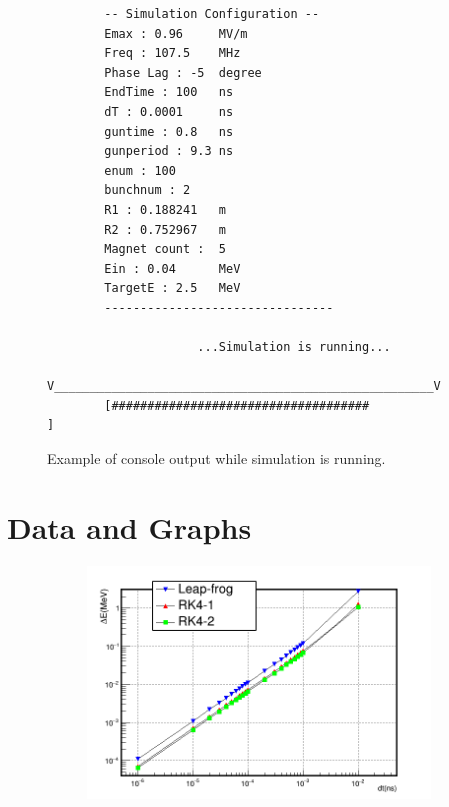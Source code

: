 \documentclass[a4paper,oneside,12pt]{report}
\numberwithin{equation}{chapter}
\begin{document}
{\begin{figure}[H]
    \centering
    \begin{verbatim}
        -- Simulation Configuration --
        Emax : 0.96     MV/m
        Freq : 107.5    MHz
        Phase Lag : -5  degree
        EndTime : 100   ns
        dT : 0.0001     ns
        guntime : 0.8   ns
        gunperiod : 9.3 ns
        enum : 100
        bunchnum : 2
        R1 : 0.188241   m
        R2 : 0.752967   m
        Magnet count :  5
        Ein : 0.04      MeV
        TargetE : 2.5   MeV
        --------------------------------
        
                     ...Simulation is running...
        V_____________________________________________________V
        [####################################                 ]
    \end{verbatim}
    \vspace{20pt}
\caption{Example of console output while simulation is running.}
\label{fig:console_output_running}
\end{figure}

\chapter{Data and Graphs}\label{appendix:data_graph}

\iffalse \begin{figure}[H]
    \centering
    \begin{subfigure}{0.9\textwidth}
        \centering
        \includegraphics[width=\linewidth]{./figures/analiz/lf_rk1_rk2_dt-E_3.png}
    \end{subfigure}
    

\end{figure}}
\end{document}
